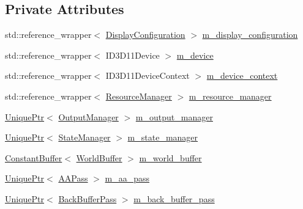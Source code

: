 \subsection*{Private Attributes}
\begin{DoxyCompactItemize}
\item 
std\+::reference\+\_\+wrapper$<$ \hyperlink{classmage_1_1rendering_1_1_display_configuration}{Display\+Configuration} $>$ \hyperlink{classmage_1_1rendering_1_1_renderer_1_1_impl_a10cf7a42791591339e7abae67e1a0624}{m\+\_\+display\+\_\+configuration}
\item 
std\+::reference\+\_\+wrapper$<$ I\+D3\+D11\+Device $>$ \hyperlink{classmage_1_1rendering_1_1_renderer_1_1_impl_acbd7937a78edf6a8c3f24fc0a300216b}{m\+\_\+device}
\item 
std\+::reference\+\_\+wrapper$<$ I\+D3\+D11\+Device\+Context $>$ \hyperlink{classmage_1_1rendering_1_1_renderer_1_1_impl_a4ab027121f4d0fd9ab8f35f5d2fcfca6}{m\+\_\+device\+\_\+context}
\item 
std\+::reference\+\_\+wrapper$<$ \hyperlink{classmage_1_1rendering_1_1_resource_manager}{Resource\+Manager} $>$ \hyperlink{classmage_1_1rendering_1_1_renderer_1_1_impl_a4e128f17ff567e4af890c730c6357c94}{m\+\_\+resource\+\_\+manager}
\item 
\hyperlink{namespacemage_a3316d7143a973e37adf1110f2e80ca31}{Unique\+Ptr}$<$ \hyperlink{classmage_1_1rendering_1_1_output_manager}{Output\+Manager} $>$ \hyperlink{classmage_1_1rendering_1_1_renderer_1_1_impl_a177cc2fc2cab6c39fc26046e1bea8b97}{m\+\_\+output\+\_\+manager}
\item 
\hyperlink{namespacemage_a3316d7143a973e37adf1110f2e80ca31}{Unique\+Ptr}$<$ \hyperlink{classmage_1_1rendering_1_1_state_manager}{State\+Manager} $>$ \hyperlink{classmage_1_1rendering_1_1_renderer_1_1_impl_a403fbd5958b798e426683c6d671b056c}{m\+\_\+state\+\_\+manager}
\item 
\hyperlink{classmage_1_1rendering_1_1_constant_buffer}{Constant\+Buffer}$<$ \hyperlink{structmage_1_1rendering_1_1_world_buffer}{World\+Buffer} $>$ \hyperlink{classmage_1_1rendering_1_1_renderer_1_1_impl_ab108fbff123947defcc47f8cf53425e0}{m\+\_\+world\+\_\+buffer}
\item 
\hyperlink{namespacemage_a3316d7143a973e37adf1110f2e80ca31}{Unique\+Ptr}$<$ \hyperlink{classmage_1_1rendering_1_1_a_a_pass}{A\+A\+Pass} $>$ \hyperlink{classmage_1_1rendering_1_1_renderer_1_1_impl_aeb6351e4bacece7f3682685d74593d18}{m\+\_\+aa\+\_\+pass}
\item 
\hyperlink{namespacemage_a3316d7143a973e37adf1110f2e80ca31}{Unique\+Ptr}$<$ \hyperlink{classmage_1_1rendering_1_1_back_buffer_pass}{Back\+Buffer\+Pass} $>$ \hyperlink{classmage_1_1rendering_1_1_renderer_1_1_impl_aa030ca4a6167a0dead99172e922ae724}{m\+\_\+back\+\_\+buffer\+\_\+pass}

\end{DoxyCompactItemize}
